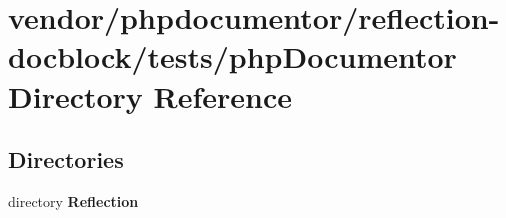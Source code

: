 \section{vendor/phpdocumentor/reflection-\/docblock/tests/php\+Documentor Directory Reference}
\label{dir_fdca690e4877688416c687d165172367}
\subsection*{Directories}
\begin{DoxyCompactItemize}
\item 
directory {\bf Reflection}
\end{DoxyCompactItemize}
